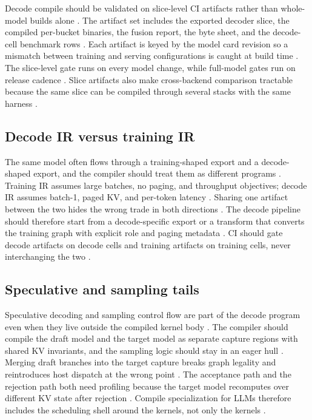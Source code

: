 Decode compile should be validated on slice-level CI artifacts rather than whole-model builds alone \citep{chen2020compilerbasedhardw,memoryfloor2026,taxbreak2026}. The artifact set includes the exported decoder slice, the compiled per-bucket binaries, the fusion report, the byte sheet, and the decode-cell benchmark rows \citep{patel2025llminference,memoryfloor2026}. Each artifact is keyed by the model card revision so a mismatch between training and serving configurations is caught at build time \citep{kwon2023vllm,chen2020compilerbasedhardw}. The slice-level gate runs on every model change, while full-model gates run on release cadence \citep{memoryfloor2026,taxbreak2026}. Slice artifacts also make cross-backend comparison tractable because the same slice can be compiled through several stacks with the same harness \citep{patel2025llminference,chen2020compilerbasedhardw}.

\subsection{Decode IR versus training IR}

The same model often flows through a training-shaped export and a decode-shaped export, and the compiler should treat them as different programs \citep{patel2025llminference,chen2020compilerbasedhardw,memoryfloor2026}. Training IR assumes large batches, no paging, and throughput objectives; decode IR assumes batch-1, paged KV, and per-token latency \citep{kwon2023vllm,taxbreak2026,dao2022flashattention}. Sharing one artifact between the two hides the wrong trade in both directions \citep{chen2020compilerbasedhardw,patel2025llminference}. The decode pipeline should therefore start from a decode-specific export or a transform that converts the training graph with explicit role and paging metadata \citep{memoryfloor2026,taxbreak2026}. CI should gate decode artifacts on decode cells and training artifacts on training cells, never interchanging the two \citep{patel2025llminference,memoryfloor2026}.

\subsection{Speculative and sampling tails}

Speculative decoding and sampling control flow are part of the decode program even when they live outside the compiled kernel body \citep{kwon2023vllm,patel2025llminference,taxbreak2026}. The compiler should compile the draft model and the target model as separate capture regions with shared KV invariants, and the sampling logic should stay in an eager hull \citep{nvidia2024cudagraphs,chen2020compilerbasedhardw}. Merging draft branches into the target capture breaks graph legality and reintroduces host dispatch at the wrong point \citep{patel2025llminference,memoryfloor2026}. The acceptance path and the rejection path both need profiling because the target model recomputes over different KV state after rejection \citep{kwon2023vllm,dao2023flashdecoding}. Compile specialization for LLMs therefore includes the scheduling shell around the kernels, not only the kernels \citep{chen2020compilerbasedhardw,taxbreak2026}.

